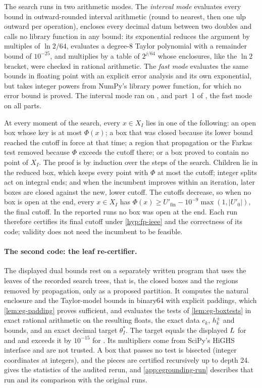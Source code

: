 The search runs in two arithmetic modes.
The \emph{interval mode} evaluates every bound in outward-rounded interval arithmetic (round to nearest, then one ulp outward per operation), encloses every decimal datum between two doubles and calls no library function in any bound: its exponential reduces the argument by multiples of $\ln2/64$, evaluates a degree-8 Taylor polynomial with a remainder bound of $10^{-25}$, and multiplies by a table of $2^{j/64}$ whose enclosures, like the $\ln2$ bracket, were checked in rational arithmetic.
The \emph{fast mode} evaluates the same bounds in floating point with an explicit error analysis and its own exponential, but takes integer powers from NumPy's library power function, for which no error bound is proved.
The interval mode ran on ,  and part~1 of , the fast mode on all parts.
\begin{remark}\label{rem:eg-search}
At every moment of the search, every $x\in X_I$ lies in one of the following:
an open box whose key is at most $\Phi(x)$;
a box that was closed because its lower bound reached the cutoff in force at that time;
a region that propagation or the Farkas test removed because $\Phi$ exceeds the cutoff there;
or a box proved to contain no point of $X_I$.
The proof is by induction over the steps of the search.
Children lie in the reduced box, which keeps every point with $\Phi$ at most the cutoff; integer splits act on integral ends; and when the incumbent improves within an iteration, later boxes are closed against the new, lower cutoff.
The cutoffs decrease, so when no box is open at the end, every $x\in X_I$ has $\Phi(x)\ge U'_{\mathrm{fin}}-10^{-9}\max(1,|U'_0|)$, the final cutoff.
In the reported runs no box was open at the end.
Each run therefore certifies its final cutoff under \cref{hyp:fp-ieee} and the correctness of its code; validity does not need the incumbent to be feasible.
\end{remark}

\paragraph{The second code: the leaf re-certifier.}
The displayed dual bounds rest on a separately written program that uses the leaves of the recorded search trees, that is, the closed boxes and the regions removed by propagation, only as a proposed partition.
It computes the natural enclosure and the Taylor-model bounds in binary64 with explicit paddings, which \cref{lem:eg-padding} proves sufficient, and evaluates the tests of \cref{lem:eg-boxtests} in exact rational arithmetic on the resulting floats, the exact data $c_k$, $h^\pm_k$ and bounds, and an exact decimal target $\theta^*_I$.
The target equals the displayed $L$ for  and  and exceeds it by $10^{-15}$ for .
Its multipliers come from SciPy's HiGHS interface and are not trusted.
A box that passes no test is bisected (integer coordinates at integers), and the pieces are certified recursively up to depth 24.
 gives the statistics of the audited rerun, and \cref{app:egrounding-run} describes that run and its comparison with the original runs.

